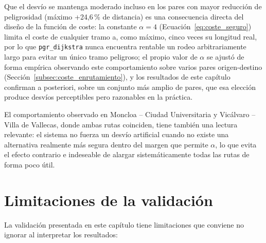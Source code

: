 Que el desvío se mantenga moderado incluso en los pares con mayor reducción de peligrosidad (máximo +24,6\,\% de distancia) es una consecuencia directa del diseño de la función de coste: la constante $\alpha = 4$ (Ecuación~\ref{eq:coste_seguro}) limita el coste de cualquier tramo a, como máximo, cinco veces su longitud real, por lo que \texttt{pgr\_dijkstra} nunca encuentra rentable un rodeo arbitrariamente largo para evitar un único tramo peligroso; el propio valor de $\alpha$ se ajustó de forma empírica observando este comportamiento sobre varios pares origen-destino (Sección~\ref{subsec:coste_enrutamiento}), y los resultados de este capítulo confirman a posteriori, sobre un conjunto más amplio de pares, que esa elección produce desvíos perceptibles pero razonables en la práctica.

El comportamiento observado en Moncloa -- Ciudad Universitaria y Vicálvaro -- Villa de Vallecas, donde ambas rutas coinciden, tiene también una lectura relevante: el sistema no fuerza un desvío artificial cuando no existe una alternativa realmente más segura dentro del margen que permite $\alpha$, lo que evita el efecto contrario e indeseable de alargar sistemáticamente todas las rutas de forma poco útil.

\section{Limitaciones de la validación}
\label{sec:limitaciones_validacion}

La validación presentada en este capítulo tiene limitaciones que conviene no ignorar al interpretar los resultados:

